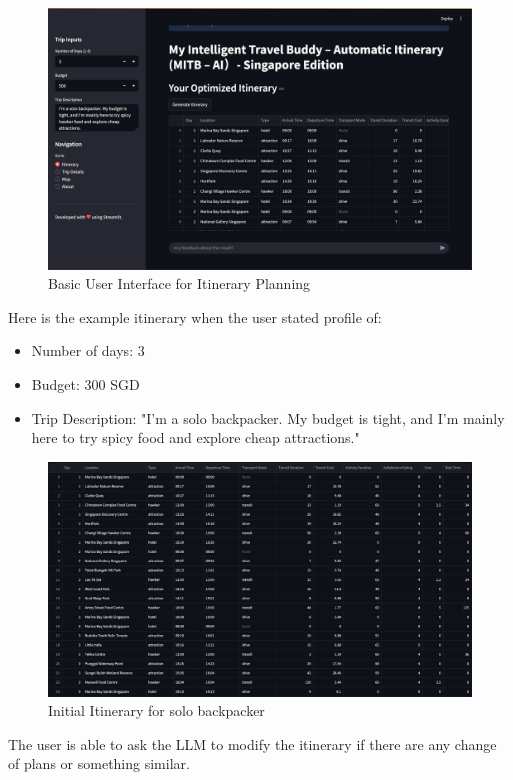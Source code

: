 \documentclass{ecai}
\begin{document}
\begin{figure}[H]
    \centering
    \includegraphics[width=0.75\linewidth]{user_interface.png}
    \caption{Basic User Interface for Itinerary Planning}
    \label{fig:enter-label}
\end{figure}
\vspace{-0.2cm}

Here is the example itinerary when the user stated profile of:
\begin{itemize}
    \item Number of days: 3
    \item Budget: 300 SGD
    \item Trip Description: "I'm a solo backpacker. My budget is tight, and I'm mainly here to try spicy food and explore cheap attractions."
\end{itemize}

\begin{figure}[H]
    \centering
    \includegraphics[width=0.75\linewidth]{itinerary_initial.png}
    \caption{Initial Itinerary for solo backpacker}
    \label{fig:enter-label}
\end{figure}
\vspace{-0.2cm}

The user is able to ask the LLM to modify the itinerary if there are any change of plans or something similar.
\vspace{-0.2cm}
\end{document}

